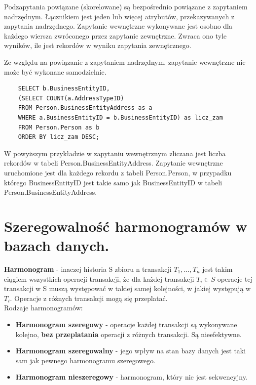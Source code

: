 \documentclass[12pt]{article}
\begin{document}
    Podzapytania powiązane (skorelowane) są bezpośrednio powiązane z zapytaniem nadrzędnym. Łącznikiem jest jeden lub więcej atrybutów, przekazywanych z zapytania nadrzędnego. Zapytanie wewnętrzne wykonywane jest osobno dla każdego wiersza zwróconego przez zapytanie zewnętrzne. Zwraca ono tyle wyników, ile jest rekordów w wyniku zapytania zewnętrznego.

    Ze względu na powiązanie z zapytaniem nadrzędnym, zapytanie wewnętrzne nie może być wykonane samodzielnie.
    \begin{verbatim}
    SELECT b.BusinessEntityID,
    (SELECT COUNT(a.AddressTypeID) 
    FROM Person.BusinessEntityAddress as a
    WHERE a.BusinessEntityID = b.BusinessEntityID) as licz_zam
    FROM Person.Person as b
    ORDER BY licz_zam DESC;
    \end{verbatim}
    
    W powyższym przykładzie w zapytaniu wewnętrznym zliczana jest liczba rekordów w tabeli Person.BusinessEntityAddress. Zapytanie wewnętrzne uruchomione jest dla każdego rekordu z tabeli Person.Person, w przypadku którego BusinessEntityID jest takie samo jak BusinessEntityID w tabeli Person.BusinessEntityAddress.
    
    \newpage

    \section{Szeregowalność harmonogramów w bazach danych.}

    \begin{definition}
        \textbf{Harmonogram} - inaczej historia S zbioru n transakcji $T_1, \dots, T_n$ jest takim ciągiem wszystkich
        operacji transakcji, że dla każdej transakcji $T_i \in S$ operacje tej transakcji w S muszą występować w takiej samej
        kolejności, w jakiej występują w $T_i$. Operacje z różnych transakcji mogą się przeplatać.\\

        Rodzaje harmonogramów:
        \begin{itemize}
            \item \textbf{Harmonogram szeregowy} - operacje każdej transakcji są wykonywane kolejno, \textbf{bez przeplatania}
            operacji z różnych transakcji. Są nieefektywne.
            \item \textbf{Harmonogram szeregowalny} - jego wpływ na stan bazy danych jest taki sam jak pewnego
            harmonogramu szeregowego.
            \item \textbf{Harmonogram nieszeregowy} - harmonogram, który nie jest sekwencyjny.
        \end{itemize}
    \end{definition}
\end{document}
